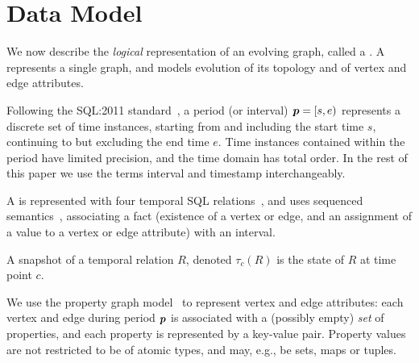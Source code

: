 \section{Data Model}
\label{sec:model}

We now describe the {\em
  logical} representation of an evolving graph, called a \tg.  A \tg
represents a single graph, and models evolution of its topology and of
vertex and edge attributes.  

Following the SQL:2011
standard~\cite{DBLP:journals/sigmod/KulkarniM12}, a period (or
interval) $\boldsymbol{p} = [s, e)$ represents a discrete set of time instances,
  starting from and including the start time $s$, continuing to but
  excluding the end time $e$.  Time instances contained within the
  period have limited precision, and the time domain has total order.
  In the rest of this paper we use the terms interval and timestamp
  interchangeably.


A \tg is represented with four temporal SQL
relations~\cite{DBLP:conf/vldb/BohlenSS96}, and uses sequenced
semantics~\cite{Dignos2012}, associating a fact (existence of a vertex
or edge, and an assignment of a value to a vertex or edge attribute)
with an interval.

A snapshot of a temporal relation $R$, denoted $\tau_c(R)$ is the
state of $R$ at time point $c$.

We use the property graph model~\cite{GraphDB} to represent vertex and
edge attributes: each vertex and edge during period $\boldsymbol{p}$ is
associated with a (possibly empty) {\em set} of properties, and each
property is represented by a key-value pair.  Property values are not
restricted to be of atomic types, and may, e.g., be sets, maps or
tuples.

